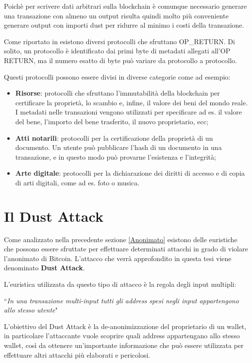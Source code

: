 Poichè per scrivere dati arbitrari sulla blockchain è comunque necessario generare una transazione con almeno un output risulta quindi molto più conveniente generare output con importi dust per ridurre al minimo i costi della transazione.

Come riportato in \cite{OP_RETURN} esistono diversi protocolli che sfruttano OP\_RETURN. Di solito, un protocollo è identificato dai primi byte di metadati allegati all'OP RETURN, ma il numero esatto di byte può variare da protocollo a protocollo. 

Questi protocolli possono essere divisi in diverse categorie come ad esempio:
\begin{itemize}
    \item \textbf{Risorse}: protocolli che sfruttano l'immutabilità della blockchain per certificare la proprietà, lo scambio e, infine, il valore dei beni del mondo reale. I metadati nelle transazioni vengono utilizzati per specificare ad es. il valore del bene, l'importo del bene trasferito, il nuovo proprietario, ecc;  
    \item \textbf{Atti notarili}: protocolli per la certificazione della proprietà di un documento. Un utente può pubblicare l'hash di un documento in una transazione, e in questo modo può provarne l'esistenza e l'integrità;
    \item \textbf{Arte digitale}: protocolli per la dichiarazione dei diritti di accesso e di copia di arti digitali, come ad es. foto o musica.
\end{itemize}

\section{Il Dust Attack}\label{dstatt}
Come analizzato nella precedente sezione \ref{Anonimato} esistono delle euristiche che possono essere sfruttate per effettuare determinati attacchi in grado di violare l'anonimato di Bitcoin. L'attacco che verrà approfondito in questa tesi viene denominato \textbf{Dust Attack}. 

L'euristica utilizzata da questo tipo di attacco è la regola degli input multipli:
\begin{center}
    ``\textit{In una transazione multi-input tutti gli address spesi negli input appartengono allo stesso utente}"
\end{center}
L'obiettivo del Dust Attack è la de-anonimizzazione del proprietario di un wallet, in particolare l'attaccante vuole scoprire quali address appartengano allo stesso wallet, così da ottenere un'importante informazione che può essere utilizzata per effettuare altri attacchi più elaborati e pericolosi.

